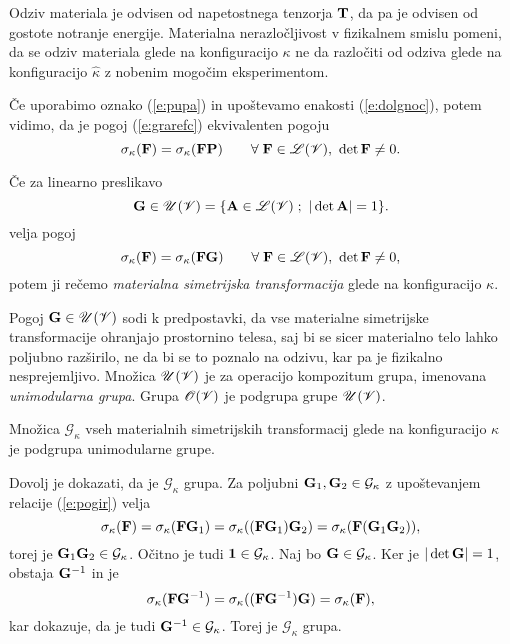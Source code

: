 Odziv materiala je odvisen od napetostnega tenzorja $\mathbf T$, da pa je odvisen
od gostote notranje energije.
Materialna nerazločljivost v fizikalnem smislu pomeni, da se odziv materiala
glede na konfiguracijo $\kappa$ ne da razločiti od odziva glede na konfiguracijo
$\widehat{\kappa}$ z nobenim mogočim eksperimentom.

Če uporabimo oznako (\ref{e:pupa}) in upoštevamo enakosti (\ref{e:dolgnoc}),
potem vidimo, da je pogoj (\ref{e:grarefc}) ekvivalenten pogoju
\begin{equation*}
	\sigma_{\kappa}(\mathbf F)=\sigma_{\kappa}(\mathbf F\mathbf P)\qquad
	\forall\;\mathbf F\in\mathscr L(\mathscr V),\ \det\mathbf F\neq 0.
\end{equation*}

\begin{definicija}
	Če za linearno preslikavo
	\[
		\ten{G}\in\mathscr{U}(\V)=\{\ten{A}\in\L(\V)\;;\ |\det\ten{A}|=1 \}.
	\]
	velja pogoj
	\begin{equation} \label{e:pogir}
		\sigma_{\kappa}(\mathbf F)=\sigma_{\kappa}(\mathbf F\mathbf G)\qquad
		\forall\;\mathbf F\in\mathscr L(\mathscr V),\ \det\mathbf F\neq 0,
	\end{equation}
	potem ji rečemo \emph{materialna simetrijska transformacija} glede na konfiguracijo $\kappa$.
\end{definicija}

Pogoj $\mathbf G\in\mathscr{U}(\mathscr V)$ sodi k predpostavki,
da vse materialne simetrijske transformacije ohranjajo prostornino telesa,
saj bi se sicer materialno telo lahko poljubno razši\-rilo, ne da bi se to poznalo na odzivu,
kar pa je fizikalno nesprejemljivo.
Množica $\mathscr{U}(\mathscr V)$ je za operacijo kompozitum grupa, imenovana \emph{unimodularna grupa}.
Grupa $\mathscr{O}(\mathscr V)$ je podgrupa grupe $\mathscr{U}(\mathscr V)$.

\begin{izrek}
	Množica $\mathcal{G}_{\kappa}$ vseh materialnih simetrijskih transformacij glede
	na konfiguracijo $\kappa$ je podgrupa unimodularne grupe.
\end{izrek}

\proof
	Dovolj je dokazati, da je $\mathcal{G}_{\kappa}$ grupa. Za poljubni $\mathbf G_1,\mathbf G_2\in\mathcal{G}_{\kappa}$
	z upoštevanjem relacije (\ref{e:pogir}) velja
	\[
		\sigma_{\kappa}(\mathbf F)=\sigma_{\kappa}(\mathbf F\mathbf G_1)
		=\sigma_{\kappa}((\mathbf F\mathbf G_1)\mathbf G_2)=\sigma_{\kappa}(\mathbf F(\mathbf G_1\mathbf G_2)),
	\]
	torej je $\mathbf G_1\mathbf G_2\in\mathcal{G}_{\kappa}$. Očitno je tudi $\mathbf 1\in\mathcal{G}_{\kappa}$.
	Naj bo $\mathbf G\in\mathcal{G}_{\kappa}$. Ker je $|\det\mathbf G|=1$, obstaja $\mathbf G^{-1}$ in je
	\[
		\sigma_{\kappa}(\mathbf F\mathbf G^{-1})=\sigma_{\kappa}((\mathbf F\mathbf G^{-1})\mathbf G)
		=\sigma_{\kappa}(\mathbf F),
	\]
	kar dokazuje, da je tudi $\mathbf G^{-1}\in\mathcal{G}_{\kappa}$. Torej je $\mathcal{G}_{\kappa}$ grupa.
\endproof

